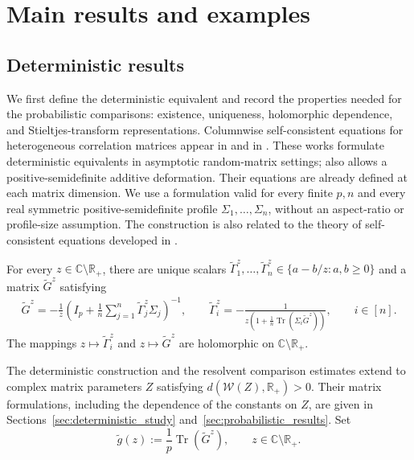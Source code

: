 \documentclass[EJP, preprint, NODS, nobera, nofontexpansion]{ejpecp}
\DeclareMathOperator{\tr}{Tr}
\begin{document}
\tableofcontents

\section{Main results and examples}
\label{sec:main_results}

\subsection{Deterministic results}
\label{sse:main_deterministic_results}
We first define the deterministic equivalent and record the properties
needed for the probabilistic comparisons: existence, uniqueness,
holomorphic dependence, and Stieltjes-transform representations.
Columnwise self-consistent equations for heterogeneous correlation
matrices appear in \cite[Theorem~1]{WagnerCouilletDebbahSlock2012} and in
\cite{kammoun2016no,Yin2020DifferentCorrelations}. These works formulate
deterministic equivalents in asymptotic random-matrix settings;
\cite{WagnerCouilletDebbahSlock2012} also allows a positive-semidefinite
additive deformation. Their equations are already defined at each matrix
dimension. We use a formulation valid for every
finite $p,n$ and every real symmetric positive-semidefinite profile
$\Sigma_1,\ldots,\Sigma_n$, without an aspect-ratio or profile-size
assumption. The construction is also related
to the theory of self-consistent equations developed in
\cite{AjankiErdosKruger2019}.

\begin{theorem}\label{the:fixed_point_existence_uniqueness}
For every $z\in\mathbb C\setminus\mathbb R_+$, there are unique scalars
$\tilde\Gamma_1^z,\ldots,\tilde\Gamma_n^z\in\{a-b/z:a,b\geq0\}$
and a matrix $\tilde G^z$ satisfying
\begin{align*}
    \tilde G^z
    =-\frac1z\left(
        I_p+\frac1n\sum_{j=1}^n\tilde\Gamma_j^z\Sigma_j
      \right)^{-1},\qquad 
    \tilde\Gamma_i^z
    =-\frac1{z\left(1+\frac1n\tr(\Sigma_i\tilde G^z)\right)},
    \qquad i\in[n].
\end{align*}
The mappings $z\mapsto\tilde\Gamma_i^z$ and $z\mapsto\tilde G^z$
are holomorphic on $\mathbb C\setminus\mathbb R_+$.
\end{theorem}

The deterministic construction and the resolvent comparison estimates extend to complex matrix parameters \(Z\) satisfying \(d(\mathcal W(Z),\mathbb R_+)>0\). Their matrix formulations, including the dependence of the constants on \(Z\), are given in 
Sections~\ref{sec:deterministic_study} and~\ref{sec:probabilistic_results}.
Set
\[
    \tilde g(z):=\frac1p\tr(\tilde G^z),\qquad z\in\mathbb C\setminus\mathbb R_+.
\]
\end{document}
